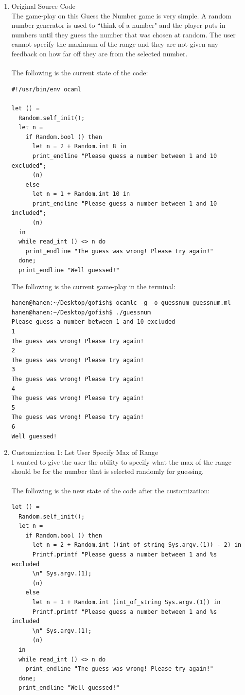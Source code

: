 \begin{enumerate}
\item Original Source Code \\The game-play on this Guess the Number game is very simple. A random number generator is used to ``think of a number" and the player puts in numbers until they guess the number that was chosen at random. The user cannot specify the maximum of the range and they are not given any feedback on how far off they are from the selected number. \\ \\
The following is the current state of the code:
\begin{verbatim}
#!/usr/bin/env ocaml
 
let () =
  Random.self_init();
  let n =
    if Random.bool () then
      let n = 2 + Random.int 8 in
      print_endline "Please guess a number between 1 and 10 excluded";
      (n)
    else
      let n = 1 + Random.int 10 in
      print_endline "Please guess a number between 1 and 10 included";
      (n)
  in
  while read_int () <> n do
    print_endline "The guess was wrong! Please try again!"
  done;
  print_endline "Well guessed!"
\end{verbatim}

The following is the current game-play in the terminal:
\begin{verbatim}
hanen@hanen:~/Desktop/gofish$ ocamlc -g -o guessnum guessnum.ml
hanen@hanen:~/Desktop/gofish$ ./guessnum
Please guess a number between 1 and 10 excluded
1
The guess was wrong! Please try again!
2
The guess was wrong! Please try again!
3
The guess was wrong! Please try again!
4
The guess was wrong! Please try again!
5
The guess was wrong! Please try again!
6
Well guessed!
\end{verbatim}

\item Customization 1: Let User Specify Max of Range \\I wanted to give the user the ability to specify what the max of the range should be for the number that is selected randomly for guessing. \\ \\
The following is the new state of the code after the customization:
\begin{verbatim}
let () =
  Random.self_init();
  let n =
    if Random.bool () then
      let n = 2 + Random.int ((int_of_string Sys.argv.(1)) - 2) in
      Printf.printf "Please guess a number between 1 and %s excluded 
      \n" Sys.argv.(1);
      (n)
    else
      let n = 1 + Random.int (int_of_string Sys.argv.(1)) in
      Printf.printf "Please guess a number between 1 and %s included 
      \n" Sys.argv.(1);
      (n)
  in
  while read_int () <> n do
    print_endline "The guess was wrong! Please try again!"
  done;
  print_endline "Well guessed!"
\end{verbatim}


\end{enumerate}
